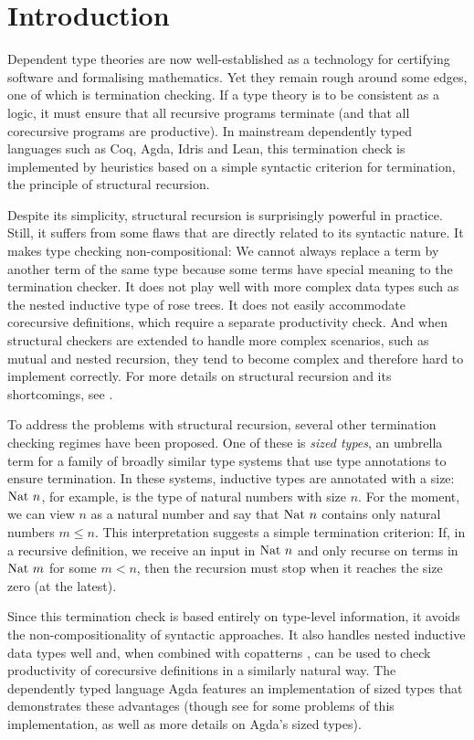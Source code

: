 \chapter{Introduction}

Dependent type theories are now well-established as a technology for certifying
software and formalising mathematics. Yet they remain rough around some edges,
one of which is termination checking. If a type theory is to be consistent as a
logic, it must ensure that all recursive programs terminate (and that all
corecursive programs are productive). In mainstream dependently typed languages
such as Coq, Agda, Idris and Lean, this termination check is implemented by
heuristics based on a simple syntactic criterion for termination, the principle
of structural recursion.

Despite its simplicity, structural recursion is surprisingly powerful in
practice. Still, it suffers from some flaws that are directly related to its
syntactic nature. It makes type checking non-compositional: We cannot always
replace a term by another term of the same type because some terms have special
meaning to the termination checker. It does not play well with more complex data
types such as the nested inductive type of rose trees. It does not easily
accommodate corecursive definitions, which require a separate productivity
check. And when structural checkers are extended to handle more complex
scenarios, such as mutual and nested recursion, they tend to become complex and
therefore hard to implement correctly. For more details on structural recursion
and its shortcomings, see .

To address the problems with structural recursion, several other termination
checking regimes have been proposed. One of these is \emph{sized types}, an
umbrella term for a family of broadly similar type systems that use type
annotations to ensure termination. In these systems, inductive types are
annotated with a size: $\mathrm{Nat}~n$, for example, is the type of natural numbers
with size $n$. For the moment, we can view $n$ as a natural number and say that
$\mathrm{Nat}~n$ contains only natural numbers $m ≤ n$. This interpretation suggests a
simple termination criterion: If, in a recursive definition, we receive an input
in $\mathrm{Nat}~n$ and only recurse on terms in $\mathrm{Nat}~m$ for some $m < n$, then the
recursion must stop when it reaches the size zero (at the latest).

Since this termination check is based entirely on type-level information, it
avoids the non-compositionality of syntactic approaches. It also handles nested
inductive data types well and, when combined with copatterns \cite{abel2016},
can be used to check productivity of corecursive definitions in a similarly
natural way. The dependently typed language Agda features an implementation of
sized types that demonstrates these advantages (though see
 for some problems of this implementation, as well as
more details on Agda's sized types).

